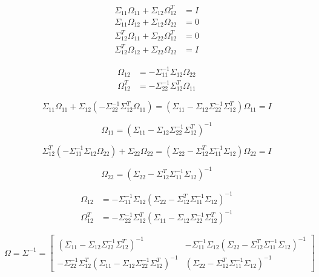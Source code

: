 \documentclass[12pt]{article}
\begin{document}
    \begin{align}
        \Sigma_{11} \Omega_{11}+ \Sigma_{12} \Omega_{12}^T &= I\\
        \Sigma_{11} \Omega_{12} + \Sigma_{12} \Omega_{22} &= 0\\
        \Sigma_{12}^T \Omega_{11} + \Sigma_{22}\Omega_{12}^T &= 0\\
        \Sigma_{12}^T \Omega_{12} + \Sigma_{22} \Omega_{22} &= I
    \end{align}

    \begin{align}
        \Omega_{12} &= -\Sigma_{11}^{-1} \Sigma_{12}\Omega_{22} \\
        \Omega_{12}^T &= -\Sigma_{22}^{-1} \Sigma_{12}^T \Omega_{11}
    \end{align}

    \begin{equation}
        \Sigma_{11} \Omega_{11} + \Sigma_{12} ( -\Sigma_{22}^{-1} \Sigma_{12}^T \Omega_{11}) = (\Sigma_{11} - \Sigma_{12} \Sigma_{22}^{-1} \Sigma_{12}^T )\Omega_{11} =I
    \end{equation}

    \begin{equation}
        \Omega_{11} = (\Sigma_{11} - \Sigma_{12} \Sigma_{22}^{-1} \Sigma_{12}^T )^{-1}
    \end{equation}

    \begin{equation}
        \Sigma_{12}^T(-\Sigma_{11}^{-1} \Sigma_{12} \Omega_{22}) + \Sigma_{22} \Omega_{22} = (\Sigma_{22} - \Sigma_{12}^T \Sigma_{11}^{-1}\Sigma_{12})\Omega_{22} = I
    \end{equation}

    \begin{equation}
        \Omega_{22} = (\Sigma_{22} - \Sigma_{12}^T \Sigma_{11}^{-1}\Sigma_{12})^{-1}
    \end{equation}

    \begin{align}
        \Omega_{12} &= -\Sigma_{11}^{-1} \Sigma_{12}(\Sigma_{22} - \Sigma_{12}^T \Sigma_{11}^{-1}\Sigma_{12})^{-1} \\
        \Omega_{12}^T &= -\Sigma_{22}^{-1} \Sigma_{12}^T (\Sigma_{11} - \Sigma_{12} \Sigma_{22}^{-1} \Sigma_{12}^T )^{-1}
    \end{align}

    \begin{equation}
        \Omega = \Sigma^{-1} = \begin{bmatrix}
            (\Sigma_{11} - \Sigma_{12} \Sigma_{22}^{-1} \Sigma_{12}^T )^{-1} & -\Sigma_{11}^{-1} \Sigma_{12}(\Sigma_{22} - \Sigma_{12}^T \Sigma_{11}^{-1}\Sigma_{12})^{-1} \\
            -\Sigma_{22}^{-1} \Sigma_{12}^T (\Sigma_{11} - \Sigma_{12} \Sigma_{22}^{-1} \Sigma_{12}^T )^{-1} & (\Sigma_{22} - \Sigma_{12}^T \Sigma_{11}^{-1}\Sigma_{12})^{-1}
        \end{bmatrix}
    \end{equation}
\end{document}
